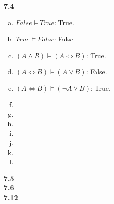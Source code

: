 \documentclass{scrartcl}
\begin{document}
\textbf{7.4}
\begin{enumerate}[(a)]
    \item $False \models True$: True.
    \item $True \models False$: False.
    \item $(A \land B) \models (A \Leftrightarrow B)$: True.
    \item $(A \Leftrightarrow B) \models (A \lor B)$: False.
    \item $(A \Leftrightarrow B) \models (\neg A \lor B)$: True.
    \item
    \item
    \item
    \item
    \item
    \item
    \item
\end{enumerate}
\textbf{7.5}\\
\textbf{7.6}\\
\textbf{7.12}
\end{document}
